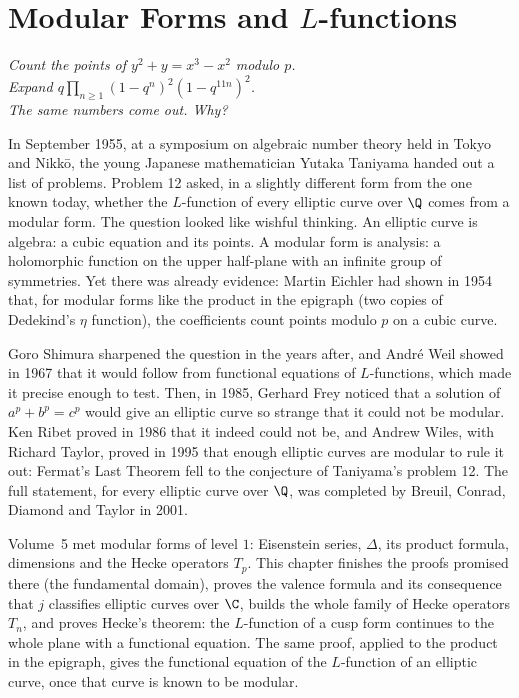 \chapter{Modular Forms and $L$-functions}
\begin{center}\itshape
Count the points of $y^2+y=x^3-x^2$ modulo $p$.\\
Expand $q\prod_{n\ge1}(1-q^n)^2(1-q^{11n})^2$.\\
The same numbers come out. Why?
\end{center}

In September 1955, at a symposium on algebraic number theory held in Tokyo and Nikk\=o, the young Japanese mathematician Yutaka Taniyama handed out a
list of problems. Problem 12 asked, in a slightly different form from the one known today, whether the $L$-function of every elliptic curve over $\Q$ comes from a
modular form. The question looked like wishful thinking. An elliptic curve is algebra: a cubic equation and its points. A modular form is analysis: a holomorphic
function on the upper half-plane with an infinite group of symmetries. Yet there was already evidence: Martin Eichler had shown in 1954 that, for modular forms like the product in the epigraph (two copies of Dedekind's
$\eta$ function), the coefficients count points modulo $p$ on a cubic curve.

Goro Shimura sharpened the question in the years after, and Andr\'e Weil showed in 1967 that it would follow from functional equations of $L$-functions, which made
it precise enough to test. Then, in 1985, Gerhard Frey noticed that a solution of $a^p+b^p=c^p$ would give an elliptic curve so strange that it could not be modular.
Ken Ribet proved in 1986 that it indeed could not be, and Andrew Wiles, with Richard Taylor, proved in 1995 that enough elliptic curves are modular to rule it out:
Fermat's Last Theorem fell to the conjecture of Taniyama's problem 12. The full statement, for every elliptic curve over $\Q$, was completed by Breuil, Conrad,
Diamond and Taylor in 2001.

Volume~5 met modular forms of level $1$: Eisenstein series, $\Delta$, its product formula, dimensions and the Hecke operators $T_p$. This chapter finishes the
proofs promised there (the fundamental domain), proves the valence formula and its consequence that $j$ classifies elliptic curves over $\C$, builds the whole
family of Hecke operators $T_n$, and proves Hecke's theorem: the $L$-function of a cusp form continues to the whole plane with a functional equation. The same
proof, applied to the product in the epigraph, gives the functional equation of the $L$-function of an elliptic curve, once that curve is known to be modular.

